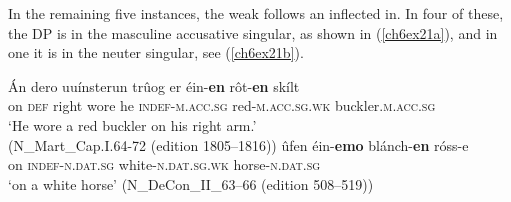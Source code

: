 \documentclass[output=paper,colorlinks,citecolor=brown]{langscibook}
\begin{document}
\begin{sloppypar}
In the remaining five instances, the weak  follows an inflected
in. In four of these, the DP is in the masculine accusative
singular, as shown in (\ref{ch6ex21a}), and in one it is in the neuter  singular,
see (\ref{ch6ex21b}).
\end{sloppypar}

\begin{exe}
\ex\label{ch6ex21}\begin{xlist}
\ex\label{ch6ex21a}
\gll Án dero uuínsterun trûog er éin-\textbf{en} rôt-\textbf{en} skílt\\
on \textsc{def} right wore he \textsc{indef-m.acc.sg} red-\textsc{m.acc.sg.wk} buckler.\textsc{m.acc.sg}\\
\glt `He wore a red buckler on his right arm.'\\(N\_Mart\_Cap.I.64-72 (edition 1805--1816))
\ex\label{ch6ex21b} 
\gll ûfen éin-\textbf{emo} blánch-\textbf{en} róss-e\\
on \textsc{indef-n.dat.sg} white-\textsc{n.dat.sg.wk} horse-\textsc{n.dat.sg}\\
\glt `on a white horse' (N\_DeCon\_II\_63--66 (edition 508--519))
\end{xlist}
\end{exe}
\end{document}
